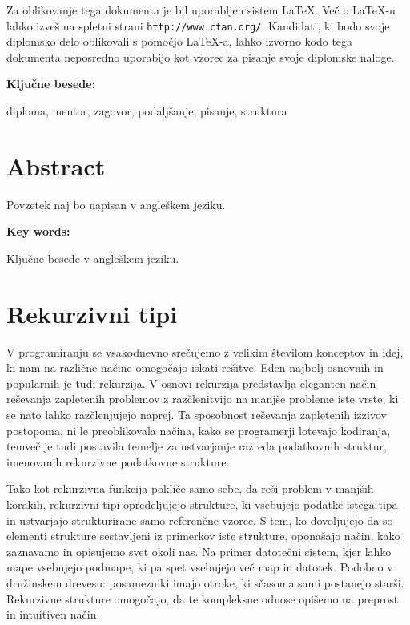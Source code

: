 \documentclass[12pt,a4paper,openany]{book}
\begin{document}
Za oblikovanje tega dokumenta je bil uporabljen sistem \LaTeX.
Ve\v c o \LaTeX-u lahko izve\v s na spletni strani \texttt{http://www.ctan.org/}.
Kandidati, ki bodo svoje diplomsko delo oblikovali s pomo\v cjo
\LaTeX-a, lahko izvorno kodo tega dokumenta neposredno uporabijo kot vzorec za pisanje svoje diplomske naloge.

\vspace{1.3cm}
\noindent
{\large \bf Ključne besede:}

\vspace{0.5cm}
\noindent
diploma, mentor, zagovor, podaljšanje, pisanje, struktura


\chapter*{Abstract}


Povzetek naj bo napisan v angleškem jeziku.

\vspace{1.3cm}
\noindent
{\large \bf Key words:}

\vspace{0.5cm}
\noindent
Ključne besede v angleškem jeziku.






\newpage
\chapter{Rekurzivni tipi}
V programiranju se vsakodnevno srečujemo z velikim številom konceptov in idej, ki nam na različne načine omogočajo iskati rešitve. Eden najbolj osnovnih in popularnih je tudi rekurzija.
V osnovi rekurzija predstavlja eleganten način reševanja zapletenih problemov z razčlenitvijo na manjše probleme iste vrste, ki se nato lahko razčlenjujejo naprej. Ta sposobnost reševanja zapletenih izzivov 
postopoma, ni le preoblikovala načina, kako se programerji lotevajo kodiranja, temveč je tudi postavila temelje za ustvarjanje razreda podatkovnih struktur, imenovanih rekurzivne podatkovne strukture.

Tako kot rekurzivna funkcija pokliče samo sebe, da reši problem v manjših korakih, rekurzivni tipi opredeljujejo strukture, ki vsebujejo podatke istega tipa in ustvarjajo strukturirane 
samo-referenčne vzorce. S tem, ko dovoljujejo da so elementi strukture sestavljeni iz primerkov iste strukture, oponašajo način, kako zaznavamo in opisujemo svet okoli nas. 
Na primer datotečni sistem, kjer lahko mape vsebujejo podmape, ki pa spet vsebujejo več map in datotek. Podobno v družinskem drevesu: posamezniki imajo otroke, ki sčasoma sami 
postanejo starši. Rekurzivne strukture omogočajo, da te kompleksne odnose opišemo na preprost in intuitiven način.
\end{document}

